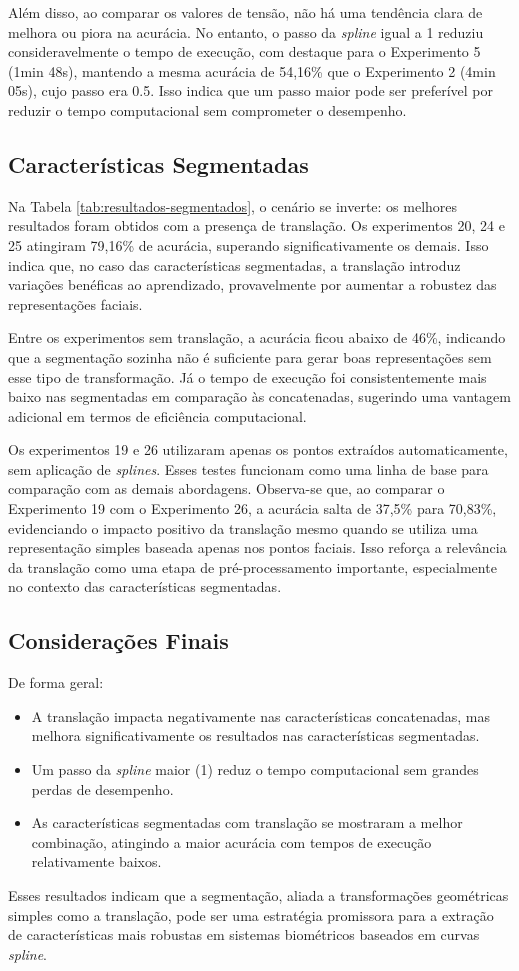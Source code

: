 Além disso, ao comparar os valores de tensão, não há uma tendência clara de melhora ou piora na acurácia. No entanto, o passo da \textit{spline} igual a 1 reduziu consideravelmente o tempo de execução, com destaque para o Experimento 5 (1min 48s), mantendo a mesma acurácia de 54,16\% que o Experimento 2 (4min 05s), cujo passo era 0.5. Isso indica que um passo maior pode ser preferível por reduzir o tempo computacional sem comprometer o desempenho.

\subsection{Características Segmentadas}

Na Tabela \ref{tab:resultados-segmentados}, o cenário se inverte: os melhores resultados foram obtidos com a presença de translação. Os experimentos 20, 24 e 25 atingiram 79,16\% de acurácia, superando significativamente os demais. Isso indica que, no caso das características segmentadas, a translação introduz variações benéficas ao aprendizado, provavelmente por aumentar a robustez das representações faciais.

Entre os experimentos sem translação, a acurácia ficou abaixo de 46\%, indicando que a segmentação sozinha não é suficiente para gerar boas representações sem esse tipo de transformação. Já o tempo de execução foi consistentemente mais baixo nas segmentadas em comparação às concatenadas, sugerindo uma vantagem adicional em termos de eficiência computacional.

Os experimentos 19 e 26 utilizaram apenas os pontos extraídos automaticamente, sem aplicação de \textit{splines}. Esses testes funcionam como uma linha de base para comparação com as demais abordagens. Observa-se que, ao comparar o Experimento 19 com o Experimento 26, a acurácia salta de 37,5\% para 70,83\%, evidenciando o impacto positivo da translação mesmo quando se utiliza uma representação simples baseada apenas nos pontos faciais. Isso reforça a relevância da translação como uma etapa de pré-processamento importante, especialmente no contexto das características segmentadas.

\subsection{Considerações Finais}

De forma geral:

\begin{itemize}
    \item A translação impacta negativamente nas características concatenadas, mas melhora significativamente os resultados nas características segmentadas.
    \item Um passo da \textit{spline} maior (1) reduz o tempo computacional sem grandes perdas de desempenho.
    \item As características segmentadas com translação se mostraram a melhor combinação, atingindo a maior acurácia com tempos de execução relativamente baixos.
\end{itemize}

Esses resultados indicam que a segmentação, aliada a transformações geométricas simples como a translação, pode ser uma estratégia promissora para a extração de características mais robustas em sistemas biométricos baseados em curvas \textit{spline}.